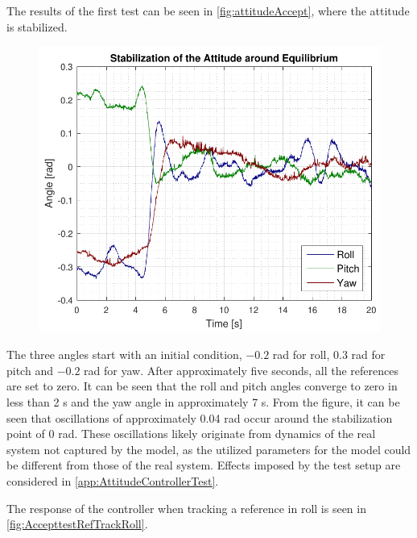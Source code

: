 The results of the first test can be seen in \autoref{fig:attitudeAccept}, where the attitude is stabilized.
\begin{figure}[H]
	\includegraphics[scale=.7]{figures/attitudeAccept.pdf}
	\centering			
	\label{fig:attitudeAccept}
\end{figure} 
%
The three angles start with an initial condition, $-0.2$ rad for roll, $0.3$ rad for pitch and $-0.2$ rad for yaw. After approximately five seconds, all the references are set to zero. It can be seen that the roll and pitch angles converge to zero in less than 2 s and the yaw angle in approximately 7 s. From the figure, it can be seen that oscillations of approximately 0.04 rad occur around the stabilization point of 0 rad. These oscillations likely originate from dynamics of the real system not captured by the model, as the utilized parameters for the model could be different from those of the real system. Effects imposed by the test setup are considered in \autoref{app:AttitudeControllerTest}.

The response of the controller when tracking a reference in roll is seen in \autoref{fig:AccepttestRefTrackRoll}.

